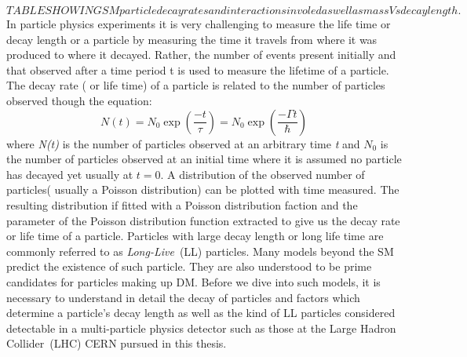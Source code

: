 \begin{equation}
 TABLE SHOWING SM particle decay rates and interactions involed as well as mass Vs decay length.
\end{equation}
 In particle physics experiments it is very challenging to measure the  life time or decay length or a particle  by measuring the time it travels from where it was produced to where it decayed. Rather, the number of events present initially and that observed after a time period t is used to measure the lifetime of a particle. The decay rate ( or life time) of a particle is related to the number of particles observed though the equation:
 \begin{equation}
 N(t) = N_{0}\exp\left(\frac{-t}{\tau}\right) = N_{0}\exp\left(\frac{-\Gamma t}{\hbar}\right) 
 \end{equation}
where \textit{N(t)} is the number of particles observed at an arbitrary time \textit{t} and $N_{0}$ is the number of particles observed at an initial time where it is assumed no particle has decayed yet usually at $ t = 0 $.
A distribution of the observed number of particles( usually a Poisson distribution) can be plotted with time measured. The resulting distribution if fitted with a Poisson distribution faction and the parameter of the Poisson distribution function extracted  to give us the decay rate or life time of a particle.
\newline
Particles with large decay length or long life time are commonly referred to as \textit{Long-Live}~(LL) particles. Many models beyond the SM predict the existence of such particle. They are also understood to be prime candidates for particles making up DM.
Before we dive into such models, it is necessary to understand in detail the decay of particles and factors which determine a particle's decay length as well as the kind of LL particles considered detectable in a multi-particle physics detector such as those at the Large Hadron Collider~(LHC) CERN pursued in this thesis.
